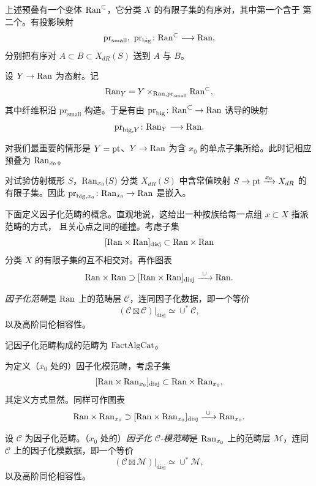 上述预叠有一个变体 $\mathrm{Ran}^{\subset}$，它分类 $X$ 的有限子集的有序对，其中第一个含于
第二个。有投影映射
\[
\mathrm{pr}_{\mathrm{small}},\ \mathrm{pr}_{\mathrm{big}}\colon
\Ran^{\subset}\longrightarrow \Ran,
\]
分别把有序对 $A\subset B\subset X_{dR}(S)$ 送到 $A$ 与 $B$。

\begin{definition}
\label{def:ran-Y}
设 $Y\to \mathrm{Ran}$ 为态射。记
\[
\mathrm{Ran}_Y=Y\times_{\mathrm{Ran},\mathrm{pr}_{\mathrm{small}}}\mathrm{Ran}^{\subset},
\]
其中纤维积沿 $\mathrm{pr}_{\mathrm{small}}$ 构造。于是有由
$\mathrm{pr}_{\mathrm{big}}\colon \mathrm{Ran}^{\subset}\to \mathrm{Ran}$ 诱导的映射
\[
\mathrm{pr}_{\mathrm{big},Y}\colon \mathrm{Ran}_Y\longrightarrow \mathrm{Ran} .
\]
\end{definition}

对我们最重要的情形是 $Y=\mathrm{pt}$、$Y\to \mathrm{Ran}$ 为含 $x_0$ 的单点子集所给。此时记相应预叠为
$\mathrm{Ran}_{x_0}$。

\begin{remark}
\label{rem:ran-x0}
对试验仿射概形 $S$，$\mathrm{Ran}_{x_0}(S)$ 分类 $X_{dR}(S)$ 中含常值映射
$S\to \mathrm{pt}\xrightarrow{x_0}X_{dR}$ 的有限子集。因此
$\mathrm{pr}_{\mathrm{big},x_0}\colon \mathrm{Ran}_{x_0}\to \mathrm{Ran}$ 是嵌入。
\end{remark}

下面定义因子化范畴的概念。直观地说，这给出一种按族给每一点组 $x\subset X$ 指派范畴的方式，
且关心点之间的碰撞。考虑子集
\[
[\mathrm{Ran}\times \mathrm{Ran}]_{\mathrm{disj}}\subset \mathrm{Ran}\times \mathrm{Ran}
\]
分类 $X$ 的有限子集的互不相交对。再作图表
\[
\mathrm{Ran}\times \mathrm{Ran}\supset [\mathrm{Ran}\times \mathrm{Ran}]_{\mathrm{disj}}
\xrightarrow{\ \cup\ }\mathrm{Ran} .
\]

\begin{definition}
\label{def:fact-cat}
\emph{因子化范畴}是 $\mathrm{Ran}$ 上的范畴层 $\mathcal{C}$，连同因子化数据，即一个等价
\[
(\mathcal{C}\boxtimes \mathcal{C})|_{\mathrm{disj}}
\simeq \cup^{*}\mathcal{C},
\]
以及高阶同伦相容性。
\end{definition}

记因子化范畴构成的范畴为 $\mathrm{FactAlgCat}$。

为定义（$x_0$ 处的）因子化模范畴，考虑子集
\[
[\mathrm{Ran}\times \mathrm{Ran}_{x_0}]_{\mathrm{disj}}\subset \mathrm{Ran}\times \mathrm{Ran}_{x_0},
\]
其定义方式显然。同样可作图表
\[
\mathrm{Ran}\times\mathrm{Ran}_{x_0}\supset[\mathrm{Ran}\times\mathrm{Ran}_{x_0}]_{\mathrm{disj}}
\xrightarrow{\ \cup\ }\mathrm{Ran}_{x_0}.
\]

\begin{definition}
\label{def:fact-modcat}
设 $\mathcal{C}$ 为因子化范畴。（$x_0$ 处的）\emph{因子化 $\mathcal{C}$-模范畴}是
$\mathrm{Ran}_{x_0}$ 上的范畴层 $\mathcal{M}$，连同 $\mathcal{C}$ 上的因子化模数据，即一个等价
\[
(\mathcal{C}\boxtimes \mathcal{M})|_{\mathrm{disj}}
\simeq \cup^{*}\mathcal{M},
\]
以及高阶同伦相容性。
\end{definition}

